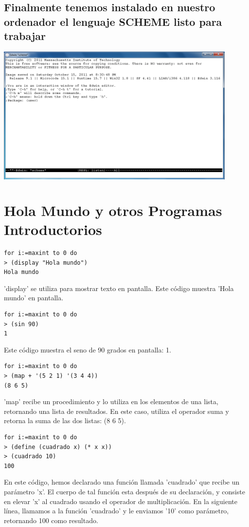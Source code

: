 \documentclass[11pt]{article} %
\begin{document}
\subsection{Finalmente tenemos instalado en nuestro ordenador el lenguaje SCHEME listo para trabajar}
\begin{center}
\includegraphics[width=12cm]{imagenes/8.png}
\end{center}

\section{Hola Mundo y otros Programas Introductorios}

\begin{lstlisting}[frame=single]  % Start your code-block
for i:=maxint to 0 do
> (display "Hola mundo")
Hola mundo
\end{lstlisting}
'display' se utiliza para mostrar texto en pantalla. Este código muestra 'Hola mundo' en pantalla.

\begin{lstlisting}[frame=single]  % Start your code-block
for i:=maxint to 0 do
> (sin 90)
1
\end{lstlisting}
Este código muestra el seno de 90 grados en pantalla: 1.

\begin{lstlisting}[frame=single]  % Start your code-block
for i:=maxint to 0 do
> (map + '(5 2 1) '(3 4 4))
(8 6 5)
\end{lstlisting}
'map' recibe un procedimiento y lo utiliza en los elementos de una lista, retornando una lista de resultados.
En este caso, utiliza el operador suma y retorna la suma de las dos listas: (8 6 5).

\begin{lstlisting}[frame=single]  % Start your code-block
for i:=maxint to 0 do
> (define (cuadrado x) (* x x))
> (cuadrado 10)
100
\end{lstlisting}
En este código, hemos declarado una función llamada 'cuadrado' que recibe un parámetro 'x'. El cuerpo de tal función esta después de su declaración, y consiste en elevar 'x' al cuadrado usando el operador de multiplicación. En la siguiente línea, llamamos a la función 'cuadrado' y le enviamos '10' como parámetro, retornando 100 como resultado.
\end{document}
